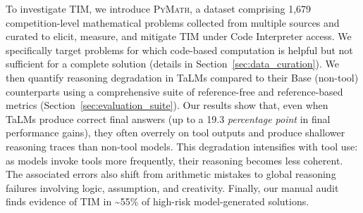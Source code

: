 \documentclass[11pt]{article}
\def \dataset{\textsc{PyMath}\xspace}
\def \task{\textsc{TIM}\xspace}
\newcommand{\pouya}[1]{{\color{violet}Pouya: #1}}
\newcommand{\estevam}[1]{{\color{blue}Estevam: #1}}
\begin{document}


To investigate \task, we introduce \dataset, a dataset comprising 1,679 competition-level mathematical problems collected from multiple sources and curated to elicit, measure, and mitigate \task under Code Interpreter access. We specifically target problems for which code-based computation is helpful but not sufficient for a complete solution
(details in Section~\ref{sec:data_curation}). We then quantify reasoning degradation in TaLMs compared to their Base (non-tool) counterparts using a comprehensive suite of reference-free and reference-based metrics (Section~\ref{sec:evaluation_suite}). Our results show that, even when TaLMs produce correct final answers (up to a 19.3 \textit{percentage point} in final performance gains), they often overrely on tool outputs and produce shallower reasoning traces than non-tool models.
This degradation intensifies with tool use: as models invoke tools more frequently, their reasoning becomes less coherent. The associated errors also shift from arithmetic mistakes to global reasoning failures involving logic, assumption, and creativity. Finally, our manual audit finds evidence of \task{} in \textasciitilde{}55\% of high-risk model-generated solutions.
\end{document}
